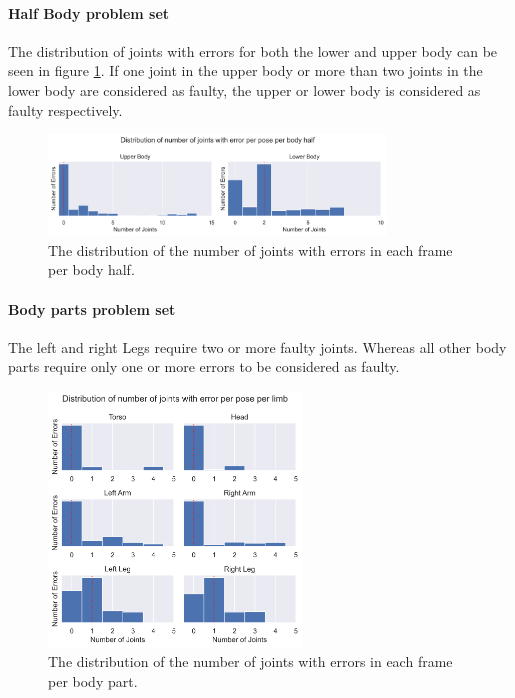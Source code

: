 \paragraph{Half Body problem set}

The distribution of joints with errors for both the lower and upper body can be seen in figure \ref{fig:dist_bh_epp}. If one joint in the upper body or more than two joints in the lower body are considered as faulty, the upper or lower body is considered as faulty respectively.

\begin{figure}[ht]
  \centering
  \includegraphics[width=0.8\textwidth]{figures/Data/joint_errors_per_pose/distribution_of_joint_errors_per_pose_per_body_half.png}
  \caption[Number of Joints with error per body half]{The distribution of the number of joints with errors in each frame per body half.}
  \label{fig:dist_bh_epp}
\end{figure}

\paragraph{Body parts problem set}

The left and right Legs require two or more faulty joints. Whereas all other body parts require only one or more errors to be considered as faulty. 

\begin{figure}[ht]
  \centering
  \includegraphics[width=0.6\textwidth]{figures/Data/joint_errors_per_pose/distribution_of_joint_errors_per_pose_per_body_part.png}
  \caption[Number of Joints with error per body part]{The distribution of the number of joints with errors in each frame per body part.}
  \label{fig:dist_lb_epp}
\end{figure}

